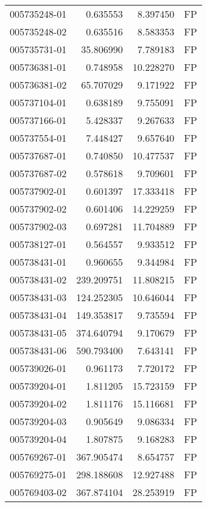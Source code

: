 \begin{tabular}{lrrl}
005735248-01 &    0.635553 &       8.397450 &   FP \\
005735248-02 &    0.635516 &       8.583353 &   FP \\
005735731-01 &   35.806990 &       7.789183 &   FP \\
005736381-01 &    0.748958 &      10.228270 &   FP \\
005736381-02 &   65.707029 &       9.171922 &   FP \\
005737104-01 &    0.638189 &       9.755091 &   FP \\
005737166-01 &    5.428337 &       9.267633 &   FP \\
005737554-01 &    7.448427 &       9.657640 &   FP \\
005737687-01 &    0.740850 &      10.477537 &   FP \\
005737687-02 &    0.578618 &       9.709601 &   FP \\
005737902-01 &    0.601397 &      17.333418 &   FP \\
005737902-02 &    0.601406 &      14.229259 &   FP \\
005737902-03 &    0.697281 &      11.704889 &   FP \\
005738127-01 &    0.564557 &       9.933512 &   FP \\
005738431-01 &    0.960655 &       9.344984 &   FP \\
005738431-02 &  239.209751 &      11.808215 &   FP \\
005738431-03 &  124.252305 &      10.646044 &   FP \\
005738431-04 &  149.353817 &       9.735594 &   FP \\
005738431-05 &  374.640794 &       9.170679 &   FP \\
005738431-06 &  590.793400 &       7.643141 &   FP \\
005739026-01 &    0.961173 &       7.720172 &   FP \\
005739204-01 &    1.811205 &      15.723159 &   FP \\
005739204-02 &    1.811176 &      15.116681 &   FP \\
005739204-03 &    0.905649 &       9.086334 &   FP \\
005739204-04 &    1.807875 &       9.168283 &   FP \\
005769267-01 &  367.905474 &       8.654757 &   FP \\
005769275-01 &  298.188608 &      12.927488 &   FP \\
005769403-02 &  367.874104 &      28.253919 &   FP \\

\end{tabular}
